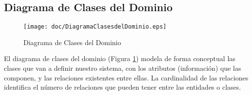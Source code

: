 \subsection{Diagrama de Clases del Dominio}
\begin{figure}[H]
\centering
\texttt{[image: doc/DiagramaClasesdelDominio.eps]}
\caption{Diagrama de Clases del Dominio}\label{fig:diagrama_clases_del_dominio}
\end{figure}
El diagrama de clases del dominio (Figura \ref{fig:diagrama_clases_del_dominio}) modela de forma conceptual las clases que van a definir nuestro sistema, con los atributos (información) que las componen, y las relaciones existentes entre ellas. La cardinalidad de las relaciones identifica el número de relaciones que pueden tener entre las entidades o clases.